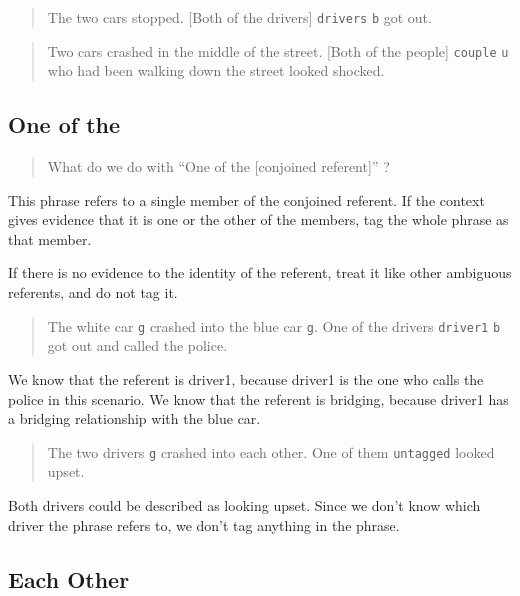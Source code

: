 \documentclass[
]{book}
\begin{document}
\begin{quote}
The two cars stopped.
{[}Both of the drivers{]} \texttt{drivers} \texttt{b} got out.
\end{quote}

\begin{quote}
Two cars crashed in the middle of the street.
{[}Both of the people{]} \texttt{couple} \texttt{u} who had been walking down the street looked shocked.
\end{quote}

\hypertarget{one-of-the}{%
\subsection{One of the}\label{one-of-the}}

\begin{quote}
What do we do with ``One of the {[}conjoined referent{]}'' ?
\end{quote}

This phrase refers to a single member of the conjoined referent.
If the context gives evidence that it is one or the other of the members, tag the whole phrase as that member.

If there is no evidence to the identity of the referent, treat it like other ambiguous referents, and do not tag it.

\begin{quote}
The white car \texttt{g} crashed into the blue car \texttt{g}.
One of the drivers \texttt{driver1} \texttt{b} got out and called the police.
\end{quote}

We know that the referent is driver1, because driver1 is the one who calls the police in this scenario.
We know that the referent is bridging, because driver1 has a bridging relationship with the blue car.

\begin{quote}
The two drivers \texttt{g} crashed into each other.
One of them \texttt{untagged} looked upset.
\end{quote}

Both drivers could be described as looking upset.
Since we don't know which driver the phrase refers to, we don't tag anything in the phrase.

\hypertarget{each-other}{%
\subsection{Each Other}\label{each-other}}
\end{document}
